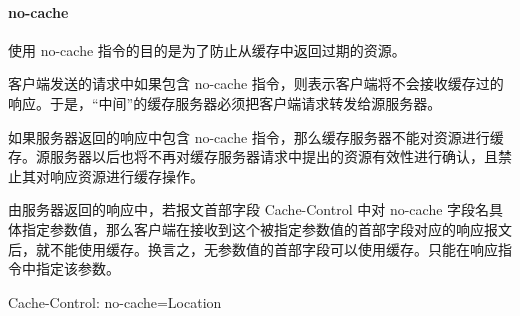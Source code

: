 \paragraph*{no-cache} 使用 no-cache 指令的目的是为了防止从缓存中返回过期的资源。

客户端发送的请求中如果包含 no-cache 指令，则表示客户端将不会接收缓存过的响应。于是，“中间”的缓存服务器必须把客户端请求转发给源服务器。

如果服务器返回的响应中包含 no-cache 指令，那么缓存服务器不能对资源进行缓存。源服务器以后也将不再对缓存服务器请求中提出的资源有效性进行确认，且禁止其对响应资源进行缓存操作。

由服务器返回的响应中，若报文首部字段 Cache-Control 中对 no-cache 字段名具体指定参数值，那么客户端在接收到这个被指定参数值的首部字段对应的响应报文后，就不能使用缓存。换言之，无参数值的首部字段可以使用缓存。只能在响应指令中指定该参数。

\begin{bash}
Cache-Control: no-cache=Location
\end{bash}